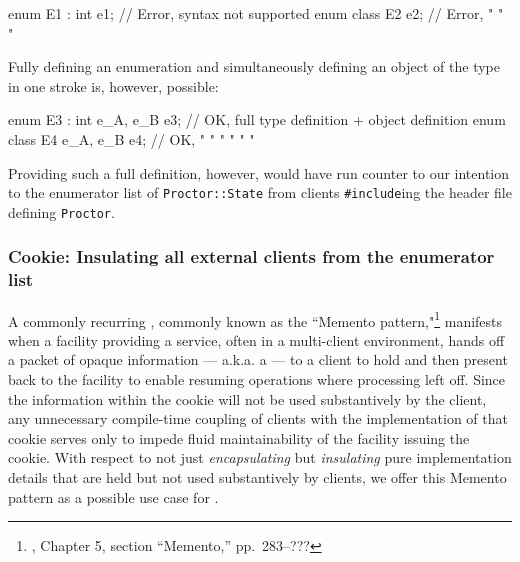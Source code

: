 \begin{emcppslisting}
enum E1 : int e1;  // Error, syntax not supported
enum class E2 e2;  // Error,    "    "     "
\end{emcppslisting}

\noindent Fully defining an enumeration and simultaneously defining an object of
the type in one stroke is, however, possible:

\begin{emcppslisting}
enum E3 : int { e_A, e_B } e3;  // OK, full type definition + object definition
enum class E4 { e_A, e_B } e4;  // OK,  "    "       "      "   "        "
\end{emcppslisting}

\noindent Providing such a full definition, however, would have run counter to our
intention to  the enumerator list of
\lstinline!Proctor::State! from clients \lstinline!#include!ing the header
file defining \lstinline!Proctor!.

\subsubsection[Cookie: Insulating all external clients from the enumerator list]{Cookie: Insulating all external clients from the enumerator list}\label{cookie:-insulating-all-external-clients-from-the-enumerator-list}

A commonly recurring , commonly known as the
``Memento pattern,"\footnote{\cite{gamma95}, Chapter 5, section ``Memento,'' pp.~283--???} manifests when a facility providing a service, often in a
multi-client environment, hands off a packet of opaque information ---
a.k.a. a  --- to a client to hold and then present back to
the facility to enable resuming operations where processing left off.
Since the information within the cookie will not be used substantively
by the client, any unnecessary compile-time coupling of clients with the
implementation of that cookie serves only to impede fluid
maintainability of the facility issuing the cookie. With respect
to not just \emph{encapsulating} but \emph{insulating} pure
implementation details that are held but not used substantively by
clients, we offer this Memento pattern as a possible use case
for .

